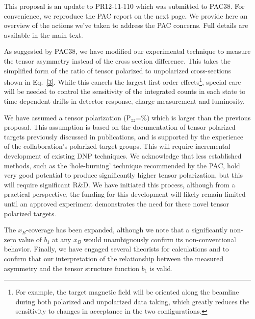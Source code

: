 This proposal is an update to PR12-11-110 which was submitted to PAC38.  For convenience, we reproduce the PAC report on the next page.   We provide here an overview of the actions we've taken to address the PAC concerns. Full details are available in the main text.

As suggested by PAC38, we have modified our experimental technique to measure the tensor asymmetry instead of the cross section difference.  This takes the simplified form of the ratio of tensor polarized to unpolarized cross-sections shown in Eq.~\ref{3}.   While this cancels the largest first order effects\footnote{For example, the target magnetic field will be oriented along the beamline during both polarized and unpolarized data taking, which greatly reduces the sensitivity to changes in acceptance in the two configurations.}, special care will be needed to control the sensitivity of the integrated counts in each state to time dependent drifts in detector response, charge measurement and luminosity. 

We have assumed a tensor polarization (P$_{zz}$=\PZZ\%) which is larger than the previous proposal. This assumption is based on the documentation of tensor polarized targets previously discussed in publications, and is supported by the experience of the collaboration's polarized target groups.   This will require incremental development of existing DNP techniques.  We acknowledge that less established methods, such as the `hole-burning' technique recommended by the PAC, hold very good potential to produce significantly higher tensor polarization, but this will require significant R\&D.  We have initiated this process, although from a practical perspective, the funding for this development will likely remain limited until an approved experiment demonstrates the need for these novel tensor polarized targets. 

The $x_B$-coverage has been expanded, although we note that a significantly non-zero value of $b_1$ at any $x_B$ would unambiguously confirm its non-conventional behavior.  Finally, we have engaged several theorists for calculations and to confirm that our interpretation of the relationship between the measured asymmetry and the tensor structure function $b_1$ is valid.



\newpage
